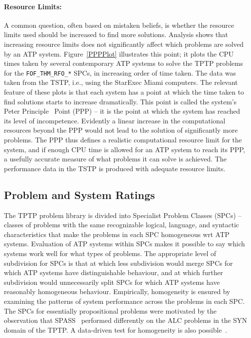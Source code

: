 \documentclass[runningheads]{llncs}
\begin{document}
\paragraph{Resource Limits:}
A common question, often based on mistaken beliefs, is whether the resource limits used should 
be increased to find more solutions.
Analysis shows that increasing resource limits does not significantly affect which problems 
are solved by an ATP system. 
Figure~\ref{PPPPlot} illustrates this point; it plots the CPU times taken by several contemporary 
ATP systems to solve the TPTP problems for the {\tt FOF\_THM\_RFO\_*} SPCs, in increasing order 
of time taken. 
The data was taken from the TSTP, i.e., using the StarExec Miami computers.
The relevant feature of these plots is that each system has a point at which the time taken to 
find solutions starts to increase dramatically. 
This point is called the system's Peter Principle~\cite{PH69} Point (PPP) -- it is the point at 
which the system has reached its level of incompetence. 
Evidently a linear increase in the computational resources beyond the PPP would not lead to the 
solution of significantly more problems. 
The PPP thus defines a realistic computational resource limit for the system, and if enough CPU 
time is allowed for an ATP system to reach its PPP, a usefully accurate measure of what problems 
it can solve is achieved.
The performance data in the TSTP is produced with adequate resource limits.

\subsection{Problem and System Ratings}
\label{Ratings}

The TPTP problem library is divided into Specialist Problem Classes (SPCs) -- classes of problems 
with the same recognizable logical, language, and syntactic characteristics that make the
problems in each SPC homogeneous wrt ATP systems.
Evaluation of ATP systems within SPCs makes it possible to say which systems work well for what 
types of problems. 
The appropriate level of subdivision for SPCs is that at which less subdivision would merge 
SPCs for which ATP systems have distinguishable behaviour, and at which further subdivision
would unnecessarily split SPCs for which ATP systems have reasonably homogeneous behaviour.
Empirically, homogeneity is ensured by examining the patterns of system performance across the 
problems in each SPC. 
The SPCs for essentially propositional problems were motivated by the observation that 
SPASS~\cite{WA+99} performed differently on the ALC problems in the SYN domain of the TPTP.
A data-driven test for homogeneity is also possible~\cite{FS02}.
\end{document}
